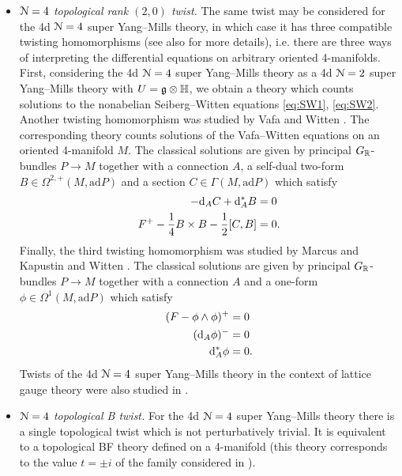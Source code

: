 \documentclass[10pt, oneside]{article}
\begin{document}
\begin{itemize}
\item \emph{$\mathcal N=4$ topological rank $(2, 0)$ twist.} The same twist may be considered for the 4d $\mathcal N=4$ super Yang--Mills theory, in which case it has three compatible twisting homomorphisms \cite{Yamron} (see also \cite{LabastidaLozano,Lozano} for more details), i.e. there are three ways of interpreting the differential equations on arbitrary oriented 4-manifolds. First, considering the 4d $\mathcal N=4$ super Yang--Mills theory as a 4d $\mathcal N=2$ super Yang--Mills theory with $U=\mathfrak g\otimes\mathbb{H}$, we obtain a theory which counts solutions to the nonabelian Seiberg--Witten equations \eqref{eq:SW1}, \eqref{eq:SW2}. Another twisting homomorphism was studied by Vafa and Witten \cite{VafaWitten}. The corresponding theory counts solutions of the Vafa--Witten equations on an oriented 4-manifold $M$. The classical solutions are given by principal $G_\mathbb R$-bundles $P\rightarrow M$ together with a connection $A$, a self-dual two-form $B\in\Omega^{2, +}(M, \mathrm{ad} P)$ and a section $C\in\Gamma(M, \mathrm{ad} P)$ which satisfy
\begin{align}
-{\rm d}_A C + {\rm d}_A^* B &= 0 \\
F^+ - \frac{1}{4}B\times B - \frac{1}{2}[C, B] &= 0.
\end{align}
Finally, the third twisting homomorphism was studied by Marcus \cite{Marcus} and Kapustin and Witten \cite{KapustinWitten}. The classical solutions are given by principal $G_\mathbb R$-bundles $P\rightarrow M$ together with a connection $A$ and a one-form $\phi\in\Omega^1(M, \mathrm{ad} P)$ which satisfy
\begin{align}
(F-\phi\wedge \phi)^+ &= 0\\
({\rm d}_A \phi)^- &= 0 \\
{\rm d}^*_A \phi &= 0.
\end{align}
Twists of the 4d $\mathcal N=4$ super Yang--Mills theory in the context of lattice gauge theory were also studied in \cite{Catterall,Unsal}.

 \item \emph{$\mathcal{N}=4$ topological B twist.} For the 4d $\mathcal N=4$ super Yang--Mills theory there is a single topological twist which is not perturbatively trivial. It is equivalent to a topological BF theory defined on a 4-manifold (this theory corresponds to the value $t=\pm i$ of the family considered in \cite{KapustinWitten}).
 

\end{itemize}
\end{document}
